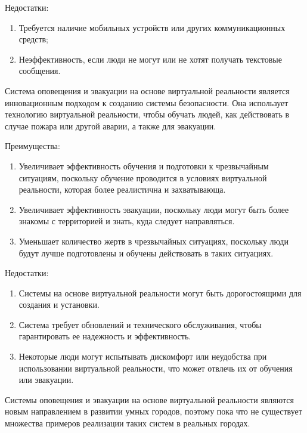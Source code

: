 \begin{multicols}{2}
Недостатки:

\begin{enumerate}
\def\labelenumi{\arabic{enumi}.}
\item
  Требуется наличие мобильных устройств или других коммуникационных
  средств;
\item
  Неэффективность, если люди не могут или не хотят получать текстовые
  сообщения.
\end{enumerate}

Система оповещения и эвакуации на основе виртуальной реальности является
инновационным подходом к созданию системы безопасности. Она использует
технологию виртуальной реальности, чтобы обучать людей, как действовать
в случае пожара или другой аварии, а также для эвакуации.

Преимущества:

\begin{enumerate}
\def\labelenumi{\arabic{enumi}.}
\item
  Увеличивает эффективность обучения и подготовки к чрезвычайным
  ситуациям, поскольку обучение проводится в условиях виртуальной
  реальности, которая более реалистична и захватывающа.
\item
  Увеличивает эффективность эвакуации, поскольку люди могут быть более
  знакомы с территорией и знать, куда следует направляться.
\item
  Уменьшает количество жертв в чрезвычайных ситуациях, поскольку люди
  будут лучше подготовлены и обучены действовать в таких ситуациях.
\end{enumerate}

Недостатки:

\begin{enumerate}
\def\labelenumi{\arabic{enumi}.}
\item
  Системы на основе виртуальной реальности могут быть дорогостоящими для
  создания и установки.
\item
  Система требует обновлений и технического обслуживания, чтобы
  гарантировать ее надежность и эффективность.
\item
  Некоторые люди могут испытывать дискомфорт или неудобства при
  использовании виртуальной реальности, что может отвлечь их от обучения
  или эвакуации.
\end{enumerate}

Системы оповещения и эвакуации на основе виртуальной реальности являются
новым направлением в развитии умных городов, поэтому пока что не
существует множества примеров реализации таких систем в реальных
городах.


\end{multicols}
